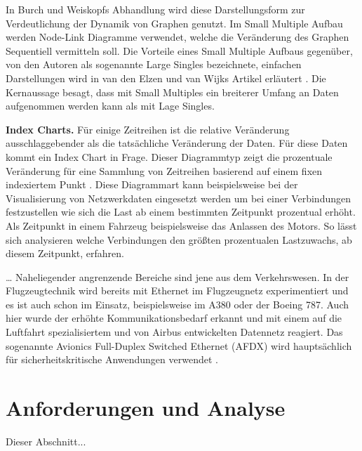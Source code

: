 \documentclass[draft=false
              ,paper=a4
              ,twoside=false
              ,fontsize=11pt
              ,headsepline
              ,BCOR10mm
              ,DIV11
              ]{scrbook}
\begin{document}
In Burch und Weiskopfs Abhandlung \cite{Burch:2014:FES:2636240.2636839} wird diese Darstellungsform zur Verdeutlichung der Dynamik von Graphen genutzt. Im Small Multiple Aufbau werden Node-Link Diagramme verwendet, welche die Veränderung des Graphen Sequentiell vermitteln soll. Die Vorteile eines Small Multiple Aufbaus gegenüber, von den Autoren als sogenannte Large Singles bezeichnete, einfachen Darstellungen wird in van den Elzen und van Wijks Artikel erläutert \cite{elzen_small_multiple_2013}. Die Kernaussage besagt, dass mit Small Multiples ein breiterer Umfang an Daten aufgenommen werden kann als mit Lage Singles.

\textbf{Index Charts.} Für einige Zeitreihen ist die relative Veränderung ausschlaggebender als die tatsächliche Veränderung der Daten. Für diese Daten kommt ein Index Chart in Frage. Dieser Diagrammtyp zeigt die prozentuale Veränderung für eine Sammlung von Zeitreihen basierend auf einem fixen indexiertem Punkt \cite{heer_tour_2010}. Diese Diagrammart kann beispielsweise bei der Visualisierung von Netzwerkdaten eingesetzt werden um bei einer Verbindungen festzustellen wie sich die Last ab einem bestimmten Zeitpunkt prozentual erhöht. Als Zeitpunkt in einem Fahrzeug beispielsweise das Anlassen des Motors. So lässt sich analysieren welche Verbindungen den größten prozentualen Lastzuwachs, ab diesem Zeitpunkt, erfahren.

\ldots
Naheliegender angrenzende Bereiche sind jene aus dem Verkehrswesen. In der Flugzeugtechnik wird bereits mit Ethernet im Flugzeugnetz experimentiert und es ist auch schon im Einsatz, beispielsweise im A380 oder der Boeing 787. Auch hier wurde der erhöhte Kommunikationsbedarf erkannt und mit einem auf die Luftfahrt spezialisiertem und von Airbus entwickelten Datennetz reagiert. Das sogenannte Avionics Full-Duplex Switched Ethernet (AFDX) wird hauptsächlich für sicherheitskritische Anwendungen verwendet \cite{steiner_recent_2014}. 



\section{Anforderungen und Analyse} %
\label{sec:anforderungen_und_analyse}
Dieser Abschnitt...
\end{document}
